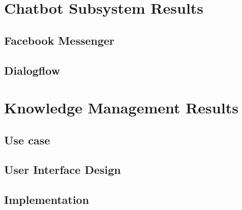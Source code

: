\documentclass[12pt,oneside,openright,a4paper]{cpe-english-project}
\begin{document}
\section{Chatbot Subsystem Results}

\subsection{Facebook Messenger}
\subsection{Dialogflow}


\section{Knowledge Management Results}
\subsection{Use case}
\subsection{User Interface Design}
\subsection{Implementation}
\end{document}
